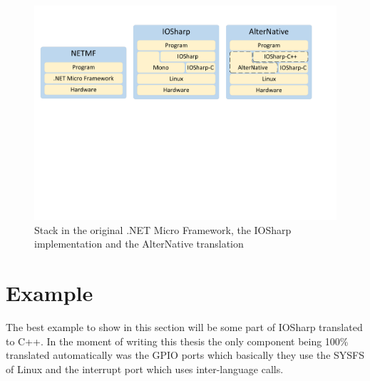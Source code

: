 \begin{figure}[H]\begin{center}
 \centering
  \captionsetup{justification=centering}
  \includegraphics[width=1\textwidth]{pictures/alternative/transformations-iosharp}
  \caption{Stack in the original .NET Micro Framework, the IOSharp implementation and the AlterNative translation\label{fig:AN-Example-IOSharp}}
\end{center}\end{figure}

\section{Example}\label{SS:AN-Process-Example}
The best example to show in this section will be some part of IOSharp translated to C++. In the moment of writing this thesis the only component being 100\% translated automatically was the GPIO ports which basically they use the \gls{SYSFS} of Linux and the interrupt port which uses inter-language calls.

